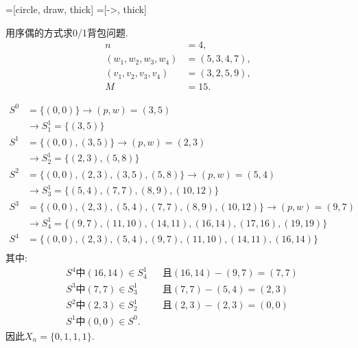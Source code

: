 \documentclass[../main.tex]{subfiles}
\begin{document}
=[circle, draw, thick]
=[->, thick]
\begin{problem}
    用序偶的方式求0/1背包问题.
    \begin{align*}
        n &= 4, \\
        (w_1, w_2, w_3, w_4) &= (5, 3, 4, 7), \\
        (v_1, v_2, v_3, v_4) &= (3, 2, 5, 9), \\
        M &= 15.
    \end{align*}
\end{problem}
\begin{solution}
\begin{align*}
    S^0 &= \{(0,0)\} \rightarrow (p,w) = (3,5)  \\
     &\rightarrow S^1_1 = \{(3,5)\} \\
    S^1 &= \{(0,0), (3,5)\} \rightarrow (p,w) = (2,3) \\ 
    &\rightarrow S^1_2 = \{(2,3),(5,8)\} \\
    S^2 &= \{(0,0), (2,3), (3,5),(5,8)\} \rightarrow (p,w) = (5,4) \\ 
    &\rightarrow S^1_3 = \{(5,4),(7,7),(8,9),(10,12)\} \\
    S^3 &= \{(0,0), (2,3), (5,4), (7,7), (8,9), (10,12)\} \rightarrow (p,w) = (9,7) \\
     &\rightarrow S^1_4 = \{(9,7),(11,10),(14,11),(16,14),(17,16),(19,19)\} \\
    S^4 &= \{(0,0), (2,3), (5,4), (9,7), (11,10), (14,11), (16,14)\} \\
\end{align*}
其中:
\begin{align*}
    &S^4 \text{中} (16,14) \in S^1_4 &&\text{且} (16,14)-(9,7) = (7,7) \\ 
    &S^3 \text{中} (7,7) \in S^1_3 &&\text{且} (7,7)-(5,4) = (2,3) \\
    &S^2 \text{中} (2,3) \in S^1_2 &&\text{且} (2,3)-(2,3) = (0,0) \\
    &S^1 \text{中} (0,0) \in S^0 .
\end{align*}
因此\(X_n = \{0,1,1,1\}\).
\end{solution}
\end{document}

